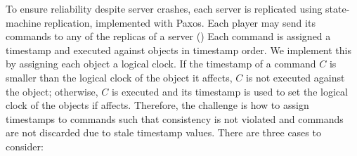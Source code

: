 \documentclass[times, 10pt]{article}
\begin{document}
To ensure reliability despite server crashes, each server is replicated using state-machine replication, implemented with Paxos. Each player may send its commands to any of the replicas of a server ()
%
Each command is assigned a timestamp and executed against objects in timestamp order. We implement this by assigning each object a logical clock.
If the timestamp of a command $C$ is smaller than the logical clock of the object it affects, $C$ is not executed against the object; otherwise, $C$ is executed and its timestamp is used to set the logical clock of the objects if affects. Therefore, the challenge is how to assign timestamps to commands such that consistency is not violated and commands are not discarded due to stale timestamp values. There are three cases to consider:


\end{document}
